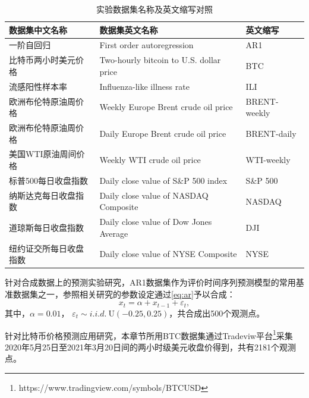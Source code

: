 \begin{table}[!t]
    \centering
    \caption{实验数据集名称及英文缩写对照 \label{tab:cnn.dataName}}
    \begin{tabularx}{\textwidth}{lXl}
        \toprule
        {数据集中文名称} & {数据集英文名称} & 英文缩写 \\  \midrule
        一阶自回归 & First order autoregression & AR1 \\
        比特币两小时美元价格  & Two-hourly bitcoin to U.S. dollar price & BTC          \\
        流感阳性样本率     & Influenza-like illness rate                & ILI          \\
        欧洲布伦特原油周价格  & Weekly Europe Brent crude oil price     & BRENT-weekly \\
        欧洲布伦特原油周价格  & Daily Europe Brent crude oil price      & BRENT-daily  \\
        美国WTI原油周间价格 & Weekly WTI crude oil price              & WTI-weekly   \\
        标普500每日收盘指数 & Daily close value of S\&P 500 index     & S\&P 500     \\
        纳斯达克每日收盘指数  & Daily close value of NASDAQ Composite   & NASDAQ       \\
        道琼斯每日收盘指数   & Daily close value of Dow Jones Average  & DJI          \\
        纽约证交所每日收盘指数 & Daily close value of NYSE Composite     & NYSE         \\
        \bottomrule
        
    \end{tabularx}

\end{table}





针对合成数据上的预测实验研究，AR1数据集作为评价时间序列预测模型的常用基准数据集之一，参照相关研究\cite{qi2008trend,crone2016feature}的参数设定通过\autoref{eq:ar}予以合成：
    \begin{equation}
        \label{eq:ar}
            x_t = \alpha + x_{t-1} + \varepsilon_t,
    \end{equation}
    其中，$\alpha = 0.01$， $\varepsilon_t \sim i.i.d.~\mathrm{U}(-0.25,0.25)$，共合成出500个观测点。

针对比特币价格预测应用研究，本章节所用BTC数据集通过Tradeviw平台\footnote{https://www.tradingview.com/symbols/BTCUSD}采集2020年5月25日至2021年3月20日间的两小时级美元收盘价得到，共有2181个观测点。

